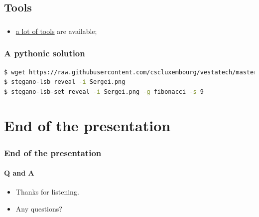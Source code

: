 \documentclass[]{beamer}
\begin{document}
\subsection{Tools}
\begin{frame}
\frametitle{}
\begin{itemize}
    \item \href{https://github.com/topics/steganography}{a lot of tools} are available;
\end{itemize}
\end{frame}

\begin{frame}[fragile]
\frametitle{A pythonic solution}
\begin{lstlisting}[language=Bash]
$ wget https://raw.githubusercontent.com/cscluxembourg/vestatech/master/challenges/sergei/Sergei.png
$ stegano-lsb reveal -i Sergei.png
$ stegano-lsb-set reveal -i Sergei.png -g fibonacci -s 9
\end{lstlisting}
\end{frame}




%
%
\section*{End of the presentation}
\begin{frame}
    \frametitle{End of the presentation}
    \framesubtitle{Q and A}
    \begin{center}
        \begin{itemize}
            \item Thanks for listening.
            \item Any questions?
        \end{itemize}
    \end{center}
\end{frame}
\end{document}
